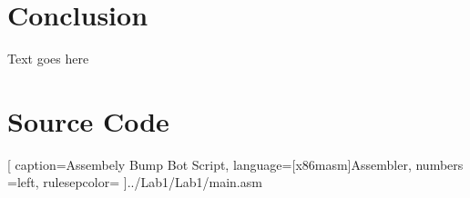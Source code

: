\documentclass[12pt,letterpaper]{article}
\begin{document}
\section{Conclusion}
Text goes here

\section{Source Code}%



[
caption=Assembely Bump Bot Script,
language={[x86masm]Assembler},
numbers =left,
rulesepcolor=\color{blue}
]{../Lab1/Lab1/main.asm}

\end{document}
